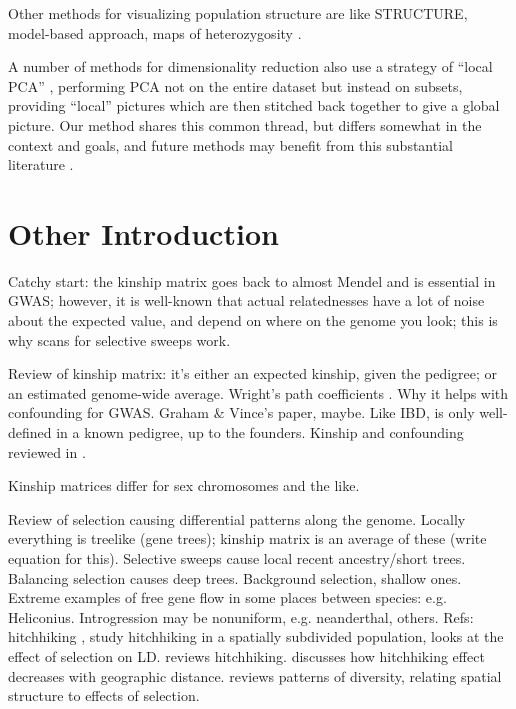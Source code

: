 \documentclass[11pt, oneside]{article}   	%
\begin{document}
Other methods for visualizing population structure are like STRUCTURE,
\citep{pritchard2000inference,falush2003inference,
falush2007inference,hubisz2009inferring} 
model-based approach,
\citep{yang2012modelbased} 
maps of heterozygosity
\citep{ramachandran2005support}. 

A number of methods for dimensionality reduction also use a strategy of ``local PCA''
\citep[e.g.][]{manjon2013diffusion,kambhatla1997dimension,weingessel2000local,roweis2000nonlinear},
performing PCA not on the entire dataset but instead on subsets,
providing ``local'' pictures which are then stitched back together to give a global picture.
Our method shares this common thread, but differs somewhat in the context and goals,
and future methods may benefit from this substantial literature \citep[reviewed in][]{vandermaaten2009dimensionality}.


\section{Other Introduction}

Catchy start: the kinship matrix goes back to almost Mendel and is essential in GWAS;
however, it is well-known that actual relatednesses have a lot of noise about the expected value,
and depend on where on the genome you look;
this is why scans for selective sweeps work.

Review of kinship matrix: 
it's either an expected kinship, given the pedigree;
or an estimated genome-wide average.
Wright's path coefficients \citep{wright1943isolation}.
Why it helps with confounding for GWAS.
Graham \& Vince's paper, maybe.
Like IBD, is only well-defined in a known pedigree, up to the founders.
Kinship and confounding reviewed in \citet{astle2009population}.

Kinship matrices differ for sex chromosomes and the like.

Review of selection causing differential patterns along the genome.
Locally everything is treelike (gene trees);
kinship matrix is an average of these (write equation for this).
Selective sweeps cause local recent ancestry/short trees.
Balancing selection causes deep trees.
Background selection, shallow ones.
Extreme examples of free gene flow in some places between species: e.g. Heliconius.
Introgression may be nonuniform, e.g. neanderthal, others.
Refs: hitchhiking \citep{maynardsmith1974hitchhiking},
\citet{kim2011hitchhiking} study hitchhiking in a spatially subdivided population,
\citet{mcvean2007structure} looks at the effect of selection on LD.
\citet{barton2000genetic} reviews hitchhiking.
\citet{bierne2010distinctive} discusses how hitchhiking effect decreases with geographic distance.
\citet{charlesworth2003review} reviews patterns of diversity, relating spatial structure to effects of selection.
\end{document}
